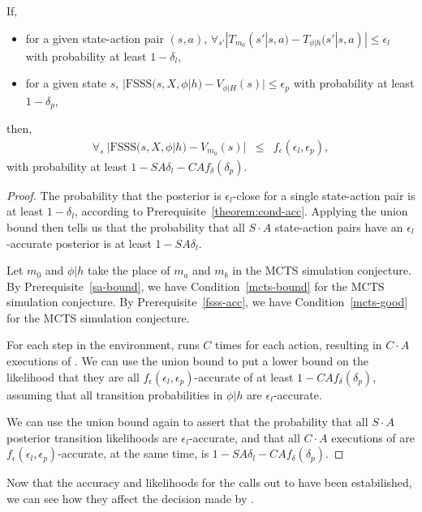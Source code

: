 \begin{lemma}
If,
\begin{itemize}
\item
for a given state-action pair $(s,a)$, $\forall_{s'} |T_{m_0}(s'|s,a) - T_{\phi|h}(s'|s,a)| \leq \epsilon_l$ with probability at least $1-\delta_l$,
\item
for a given state $s$, $|\mbox{FSSS}(s,X,\phi|h)-V_{\phi|H}(s)| \leq \epsilon_p$ with probability at least $1-\delta_p$,
\end{itemize}
then,
\begin{eqnarray}
\forall_s \ |\mbox{FSSS}(s,X,\phi|h) - V_{m_0}(s)| &\leq& f_\epsilon(\epsilon_l,\epsilon_p),
\end{eqnarray}
with probability at least $1-S A \delta_l - C A f_\delta(\delta_p)$.
\end{lemma}
\begin{proof}
The probability that the posterior is $\epsilon_l$-close for a single state-action pair is at least $1-\delta_l$, according to  Prerequisite~\ref{theorem:cond-acc}. Applying the union bound then tells us that the probability that all $S \cdot A$ state-action pairs have an $\epsilon_l$-accurate posterior is at least $1- SA \delta_l$.

Let $m_0$ and $\phi|h$ take the place of $m_a$ and $m_b$ in the MCTS simulation conjecture.
By Prerequisite~\ref{sa-bound}, we have Condition~\ref{mcts-bound} for the MCTS simulation conjecture. 
By Prerequisite~\ref{fsss-acc}, we have Condition~\ref{mcts-good} for the MCTS simulation conjecture.

For each step in the environment,  runs  $C$ times for each action, resulting in $C\cdot A$ executions of . We can use the union bound to put a lower bound on the likelihood that they are all $f_\epsilon(\epsilon_l, \epsilon_p)$-accurate of at least $1-CAf_\delta(\delta_{p})$, assuming that all transition probabilities in $\phi|h$ are $\epsilon_l$-accurate.

We can use the union bound again to assert that the probability that all $S\cdot A$ posterior transition likelihoods are $\epsilon_l$-accurate, and that all $C\cdot A$ executions of  are $f_\epsilon(\epsilon_l,\epsilon_p)$-accurate, at the same time, is $1 - SA \delta_l-CAf_\delta(\delta_p)$.
\end{proof}

Now that the accuracy and likelihoods for the calls out to  have been estabilished, we can see how they affect the decision made by .

